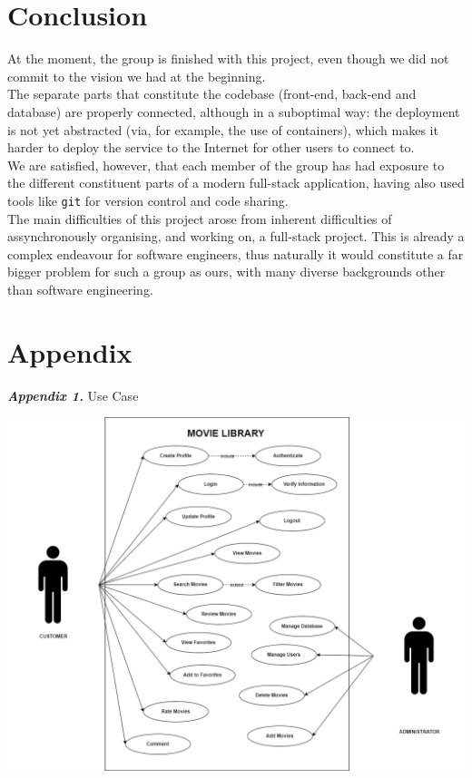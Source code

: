 \documentclass[letterpaper,twocolumn]{article}
\newcommand{\myparagraph}[1]{\vspace{0.1cm}\noindent \textbf{\textit{#1.}}}
\begin{document}
\newpage{}

\section{Conclusion}

At the moment, the group is finished with this project, even though we did not commit to the vision we had at the beginning. \\

The separate parts that constitute the codebase (front-end, back-end and database) are properly connected, although in a suboptimal way: the deployment is not yet abstracted (via, for example, the use of containers), which makes it harder to deploy the service to the Internet for other users to connect to. \\

We are satisfied, however, that each member of the group has had exposure to the different constituent parts of a modern full-stack application, having also used tools like \texttt{git} for version control and code sharing. \\

The main difficulties of this project arose from inherent difficulties of assynchronously organising, and working on, a full-stack project. This is already a complex endeavour for software engineers, thus naturally it would constitute a far bigger problem for such a group as ours, with many diverse backgrounds other than software engineering. \\

\newpage{}

\section{Appendix}

\myparagraph{Appendix 1} Use Case
\vspace{2ex}

\includegraphics[scale=0.40]{images/USE CASE WET.drawio.png}\\[0.1cm] 
\end{document}
